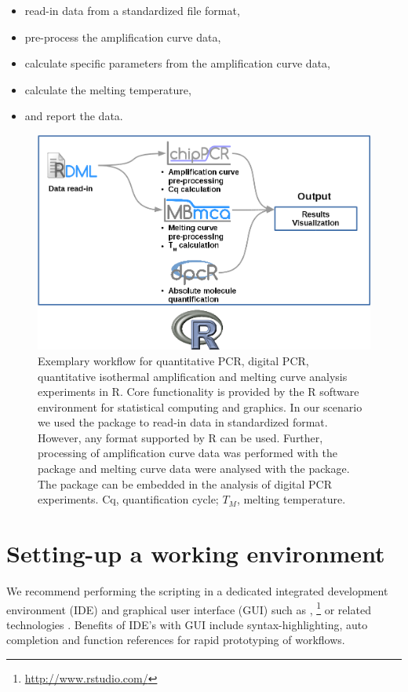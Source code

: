 \begin{itemize}
 \item read-in data from a standardized file format,
 \item pre-process the amplification curve data,
 \item calculate specific parameters from the amplification curve data,
 \item calculate the melting temperature,
 \item and report the data.
\end{itemize}

\begin{figure}[htbp]
  \centering
  \includegraphics{figures/workflow.png}
  \caption{Exemplary workflow for quantitative PCR, digital PCR, quantitative 
isothermal amplification and melting curve analysis experiments in R. Core 
functionality is provided by the R software environment for statistical 
computing and graphics. In our scenario we used the  package to 
read-in data in standardized format. However, any format supported by R can be 
used. Further, processing of amplification curve data was performed with the 
 package and melting curve data were analysed with the 
 package. The  package can be embedded in the 
analysis of digital PCR experiments. Cq, quantification cycle; $T_{M}$, melting 
temperature. 
} 
\label{figure:workflow}
\end{figure}

\section{Setting-up a working environment}

We recommend performing the scripting in a dedicated integrated development 
environment (IDE) and graphical user interface (GUI) such as  
\citep{rodiger_rkward_2012}, 
\footnote{\url{http://www.rstudio.com/}} or related technologies 
\citep{Valero_2012}. Benefits of IDE's with GUI include syntax-highlighting, 
auto completion and function references for rapid prototyping of workflows.

